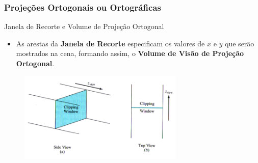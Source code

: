 \documentclass{beamer}
\begin{document}
\begin{frame}
\frametitle{Projeções Ortogonais ou Ortográficas}
	\begin{block}{Janela de Recorte e Volume de Projeção Ortogonal}
		\begin{itemize}
			\item As arestas da \textbf{Janela de Recorte} especificam os valores de $x$ e $y$ que serão mostrados na cena, formando assim, o \textbf{Volume de Visão de Projeção Ortogonal}.
		\end{itemize}
	\end{block}
	\begin{figure}[!h]
			\begin{center}
			\includegraphics[width=0.7\textwidth]{Figures/VolOrt}
			\end{center}
	\end{figure}
\end{frame}
\end{document}
